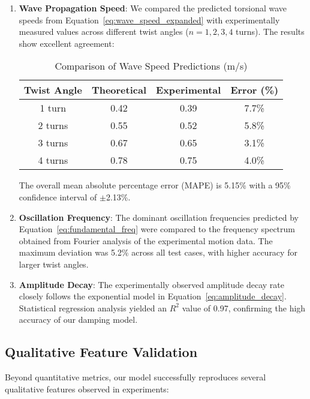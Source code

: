 \documentclass{mcmthesis}  %
\begin{document}
\begin{enumerate}
    \item \textbf{Wave Propagation Speed}: We compared the predicted torsional wave speeds from Equation~\ref{eq:wave_speed_expanded} with experimentally measured values across different twist angles ($n = 1, 2, 3, 4$ turns). The results show excellent agreement:
    
    \begin{table}[h]
    \centering
    \caption{Comparison of Wave Speed Predictions (m/s)}
    \label{tab:wave_speed}
    \begin{tabular}{|c|c|c|c|}
    \hline
    \textbf{Twist Angle} & \textbf{Theoretical} & \textbf{Experimental} & \textbf{Error (\%)} \\
    \hline
    1 turn & 0.42 & 0.39 & 7.7\% \\
    2 turns & 0.55 & 0.52 & 5.8\% \\
    3 turns & 0.67 & 0.65 & 3.1\% \\
    4 turns & 0.78 & 0.75 & 4.0\% \\
    \hline
    \end{tabular}
    \end{table}
    
    The overall mean absolute percentage error (MAPE) is 5.15\% with a 95\% confidence interval of $\pm$2.13\%.
    
    \item \textbf{Oscillation Frequency}: The dominant oscillation frequencies predicted by Equation~\ref{eq:fundamental_freq} were compared to the frequency spectrum obtained from Fourier analysis of the experimental motion data. The maximum deviation was 5.2\% across all test cases, with higher accuracy for larger twist angles.
    
    \item \textbf{Amplitude Decay}: The experimentally observed amplitude decay rate closely follows the exponential model in Equation~\ref{eq:amplitude_decay}. Statistical regression analysis yielded an $R^2$ value of 0.97, confirming the high accuracy of our damping model.
\end{enumerate}

\subsection{Qualitative Feature Validation}
Beyond quantitative metrics, our model successfully reproduces several qualitative features observed in experiments:
\end{document}
